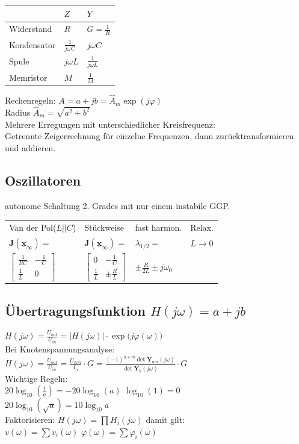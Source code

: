 \documentclass[6pt,a4paper]{scrartcl}
\newcommand{\mat}[1]{\ensuremath{\begin{bmatrix} #1 \end{bmatrix}}}				%
\newcommand{\ma}[1]{\ensuremath{{\boldsymbol {#1}}}}
\renewcommand{\vec}[1]{\ensuremath{\underline{\boldsymbol {#1}}}}
\newcommand{\ra}[0]{\ensuremath{\rightarrow}} 									%
\begin{document}
\begin{multicols}{4}
\everymath{\displaystyle}
\begin{tabular}{l|ll}
	& $Z$ & $Y$\\ \midrule
Widerstand & $R$ & $G = \frac{1}{R}$ \\
Kondensator & $\frac{1}{j \omega C}$ & $j \omega C$\\
Spule & $j \omega L$ & $\frac{1}{j \omega L}$ \\
Memristor & $M$ & $\frac{1}{M}$\\
\end{tabular}
\everymath{\textstyle}



Rechenregeln:
$A = a + j b = \hat A_m \exp(j \varphi)$\\
Radius $\hat A_m = \sqrt{a^2 + b^2}$\\

Mehrere Erregungen mit unterschiedlicher Kreisfrequenz:\\
Getrennte Zeigerrechnung für einzelne Frequenzen, dann zurücktransformieren und addieren.

\subsection{Oszillatoren}
autonome Schaltung 2. Grades mit nur einem instabile GGP.\\
\begin{tabular}{l|lll}
Van der Pol($L||C$) & Stückweise & fast harmon. & Relax.\\
$\ma J(\vec x_\infty)=$ & $\ma J(\vec x_\infty)=$ & $\lambda_{1/2} =$ & $L\ra 0$\\
$\mat{\frac{1}{RC} & -\frac{1}{C} \\ \frac{1}{L} & 0}$ & $\mat{0 & -\frac{1}{C} \\ \frac{1}{L} & \pm \frac{R}{L} }$ & $\pm \frac{R}{2L} \pm j \omega_0$\\
\end{tabular}




\subsection{Übertragungsfunktion $H(j\omega) = a + j b$}
$H(j \omega) = \frac{U_{out}}{U_{in}} = |H(j \omega)| \cdot \exp\bigl(j\varphi(\omega)\bigr)$\\

Bei Knotenspannungsanalyse:\\
$H(j\omega) = \frac{U_{out}}{U_{in}} = \frac{U_{Km}}{I_n}\cdot G = \frac{(-1)^{n+m} \det \ma Y_{nm}(j\omega)}{\det \ma Y_k(j\omega)}\cdot G$\\[0.5em]
Wichtige Regeln:\\
$20\log_{10} \left( \frac{1}{a} \right) = -20\log_{10} \left( a \right)$ \qquad $\log_{10}(1) = 0$\\ $20\log_{10} \left( \sqrt{a} \right) = 10\log_{10} a$ \\[0.5em]
Faktorisieren: $H(j \omega) = \prod H_i(j \omega)$ damit gilt:\\
$v(\omega) = \sum v_i(\omega)$ \qquad $\varphi(\omega) = \sum \varphi_i(\omega)$\\


\end{multicols}
\end{document}
